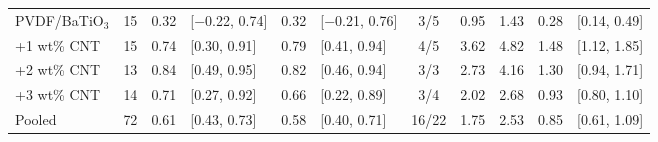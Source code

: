 \begin{tabular}{l r rl rl c rr rl}
PVDF/BaTiO$_3$ & 15 & 0.32 & [$-$0.22, 0.74] & 0.32 & [$-$0.21, 0.76] & 3/5 & 0.95 & 1.43 & 0.28 & [0.14, 0.49] \\
+1 wt\% CNT & 15 & 0.74 & [0.30, 0.91] & 0.79 & [0.41, 0.94] & 4/5 & 3.62 & 4.82 & 1.48 & [1.12, 1.85] \\
+2 wt\% CNT & 13 & 0.84 & [0.49, 0.95] & 0.82 & [0.46, 0.94] & 3/3 & 2.73 & 4.16 & 1.30 & [0.94, 1.71] \\
+3 wt\% CNT & 14 & 0.71 & [0.27, 0.92] & 0.66 & [0.22, 0.89] & 3/4 & 2.02 & 2.68 & 0.93 & [0.80, 1.10] \\
Pooled & 72 & 0.61 & [0.43, 0.73] & 0.58 & [0.40, 0.71] & 16/22 & 1.75 & 2.53 & 0.85 & [0.61, 1.09] \\
\bottomrule
\end{tabular}
